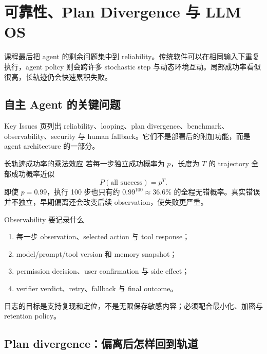 \section{可靠性、Plan Divergence 与 LLM OS}

课程最后把 agent 的剩余问题集中到 reliability。传统软件可以在相同输入下重复执行，agent policy 则会跨许多 stochastic step 与动态环境互动。局部成功率看似很高，长轨迹仍会快速累积失败。

\subsection{自主 Agent 的关键问题}

Key Issues 页列出 reliability、looping、plan divergence、benchmark、observability、security 与 human fallback。它们不是部署后的附加功能，而是 agent architecture 的一部分。


\begin{importantbox}{长轨迹成功率的乘法效应}
若每一步独立成功概率为 $p$，长度为 $T$ 的 trajectory 全部成功概率近似
\[
P(\text{all success})=p^T.
\]
即使 $p=0.99$，执行 100 步也只有约 $0.99^{100}\approx 36.6\%$ 的全程无错概率。真实错误并不独立，早期偏离还会改变后续 observation，使失败更严重。
\end{importantbox}


\begin{knowledgebox}{Observability 要记录什么}
\begin{enumerate}
  \item 每一步 observation、selected action 与 tool response；
  \item model/prompt/tool version 和 memory snapshot；
  \item permission decision、user confirmation 与 side effect；
  \item verifier verdict、retry、fallback 与 final outcome。
\end{enumerate}
日志的目标是支持复现和定位，不是无限保存敏感内容；必须配合最小化、加密与 retention policy。
\end{knowledgebox}

\subsection{Plan divergence：偏离后怎样回到轨道}

